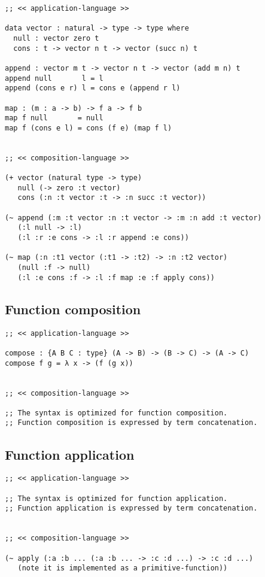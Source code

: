 \documentclass[numbers]{sigplanconf}
\begin{document}
{\scriptsize\begin{verbatim}
;; << application-language >>

data vector : natural -> type -> type where
  null : vector zero t
  cons : t -> vector n t -> vector (succ n) t

append : vector m t -> vector n t -> vector (add m n) t
append null       l = l
append (cons e r) l = cons e (append r l)

map : (m : a -> b) -> f a -> f b
map f null       = null
map f (cons e l) = cons (f e) (map f l)


;; << composition-language >>

(+ vector (natural type -> type)
   null (-> zero :t vector)
   cons (:n :t vector :t -> :n succ :t vector))

(~ append (:m :t vector :n :t vector -> :m :n add :t vector)
   (:l null -> :l)
   (:l :r :e cons -> :l :r append :e cons))

(~ map (:n :t1 vector (:t1 -> :t2) -> :n :t2 vector)
   (null :f -> null)
   (:l :e cons :f -> :l :f map :e :f apply cons))
\end{verbatim}}

\newpage

\subsection{Function composition}

{\scriptsize\begin{verbatim}
;; << application-language >>

compose : {A B C : type} (A -> B) -> (B -> C) -> (A -> C)
compose f g = λ x -> (f (g x))


;; << composition-language >>

;; The syntax is optimized for function composition.
;; Function composition is expressed by term concatenation.
\end{verbatim}}

\subsection{Function application}

{\scriptsize\begin{verbatim}
;; << application-language >>

;; The syntax is optimized for function application.
;; Function application is expressed by term concatenation.


;; << composition-language >>

(~ apply (:a :b ... (:a :b ... -> :c :d ...) -> :c :d ...)
   (note it is implemented as a primitive-function))
\end{verbatim}}
\end{document}
